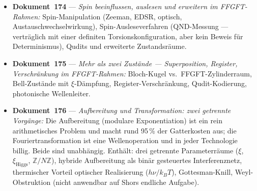 \begin{itemize}
  \item \textbf{Dokument~174} --- \textit{Spin beeinflussen, auslesen und erweitern
    im FFGFT-Rahmen:}
    Spin-Manipulation (Zeeman, EDSR, optisch, Austauschwechselwirkung),
    Spin-Ausleseverfahren (QND-Messung --- verträglich mit einer definiten
    Torsionskonfiguration, aber kein Beweis für Determinismus),
    Qudits und erweiterte Zustandsräume.

  \item \textbf{Dokument~175} --- \textit{Mehr als zwei Zustände --- Superposition,
    Register, Verschränkung im FFGFT-Rahmen:}
    Bloch-Kugel vs.\ FFGFT-Zylinderraum, Bell-Zustände mit $\xi$-Dämpfung,
    Register-Verschränkung, Qudit-Kodierung, photonische Wellenleiter.

  \item \textbf{Dokument~176} --- \textit{Aufbereitung und Transformation: zwei
    getrennte Vorgänge:}
    Die Aufbereitung (modulare Exponentiation) ist ein rein arithmetisches Problem
    und macht rund 95\,\% der Gatterkosten aus; die Fouriertransformation ist eine
    Wellenoperation und in jeder Technologie billig. Beide sind unabhängig.
    Enthält: drei getrennte Parameterräume ($\xi$, $\xi_{\text{Higgs}}$,
    $\mathbb{Z}/N\mathbb{Z}$), hybride Aufbereitung als binär gesteuertes
    Interferenznetz, thermischer Vorteil optischer Realisierung
    ($h\nu/k_BT$), Gottesman-Knill, Weyl-Obstruktion (nicht anwendbar auf
    Shors endliche Aufgabe).
\end{itemize}
